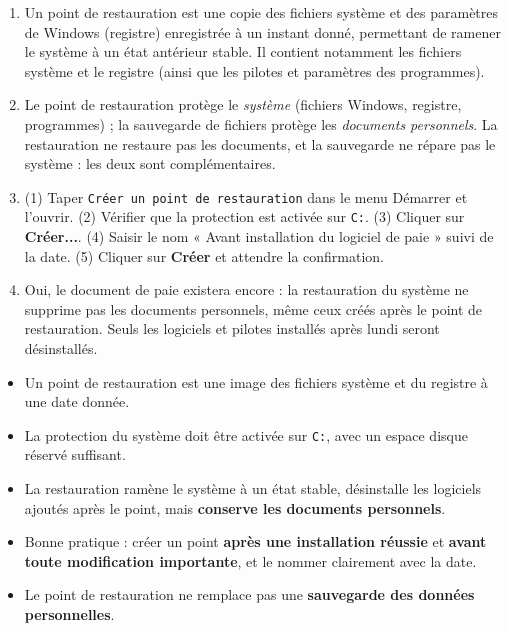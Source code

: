 \documentclass[11pt]{article}
\newcommand{\cle}[1]{{\popxbold\color{popdark}#1}}
\begin{document}
\begin{corrige}[Exercice 1]
\begin{enumerate}
\item Un point de restauration est une copie des fichiers système et des paramètres de Windows (registre) enregistrée à un instant donné, permettant de ramener le système à un état antérieur stable. Il contient notamment les fichiers système et le registre (ainsi que les pilotes et paramètres des programmes).
\item Le point de restauration protège le \emph{système} (fichiers Windows, registre, programmes) ; la sauvegarde de fichiers protège les \emph{documents personnels}. La restauration ne restaure pas les documents, et la sauvegarde ne répare pas le système : les deux sont complémentaires.
\item (1) Taper \texttt{Créer un point de restauration} dans le menu Démarrer et l'ouvrir. (2) Vérifier que la protection est activée sur \texttt{C:}. (3) Cliquer sur \textbf{Créer...}. (4) Saisir le nom « Avant installation du logiciel de paie » suivi de la date. (5) Cliquer sur \textbf{Créer} et attendre la confirmation.
\item Oui, le document de paie existera encore : la restauration du système ne supprime pas les documents personnels, même ceux créés après le point de restauration. Seuls les logiciels et pilotes installés après lundi seront désinstallés.
\end{enumerate}
\end{corrige}

\begin{aretenir}
\begin{itemize}
\item Un \cle{point de restauration} est une image des fichiers système et du registre à une date donnée.
\item La \cle{protection du système} doit être activée sur \texttt{C:}, avec un espace disque réservé suffisant.
\item La restauration ramène le système à un état stable, désinstalle les logiciels ajoutés après le point, mais \textbf{conserve les documents personnels}.
\item Bonne pratique : créer un point \textbf{après une installation réussie} et \textbf{avant toute modification importante}, et le nommer clairement avec la date.
\item Le point de restauration ne remplace pas une \textbf{sauvegarde des données personnelles}.
\end{itemize}
\end{aretenir}
\end{document}
